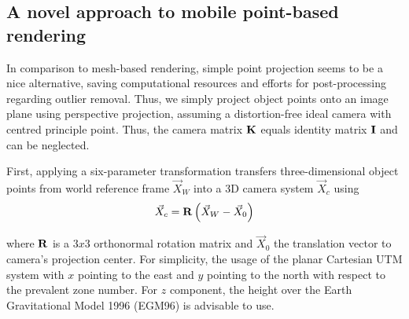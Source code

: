 \documentclass[review]{elsarticle}
\begin{document}

\subsection{A novel approach to mobile point-based rendering}
\label{sec:algorithms:pbr}
In comparison to mesh-based rendering, simple point projection seems to be a nice alternative, saving computational resources and efforts for post-processing regarding outlier removal. Thus, we simply project object points onto an image plane using perspective projection, assuming a distortion-free ideal camera with centred principle point. Thus, the camera matrix $\bf K$ equals identity matrix $\bf I$ and can be neglected.

First, applying a six-parameter transformation transfers three-dimensional object points from world reference frame $\vec{X}_W$ into a 3D camera system $\vec{X}_c $ using
\begin{equation}
\vec{X}_c = {\bf R} \left( \vec{X}_W - \vec{X}_0 \right) 
\label{eq:projection_simple}
\end{equation} 

where $\bf R$ is a $3x3$ orthonormal rotation matrix and $\vec{X}_0 $ the translation vector to camera's projection center. For simplicity, the usage of the planar Cartesian UTM system with $x$ pointing to the east and $y$ pointing to the north with respect to the prevalent zone number. For $z$ component, the height over the Earth Gravitational Model 1996 (EGM96) is advisable to use. 
\end{document}
